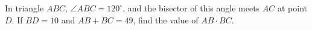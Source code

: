 In triangle $ABC$, $\angle ABC=120^{\circ}$, and the bisector of this angle meets $AC$ at point $D$. If $BD=10$ and $AB+BC=49$, find the value of $AB \cdot BC$.
